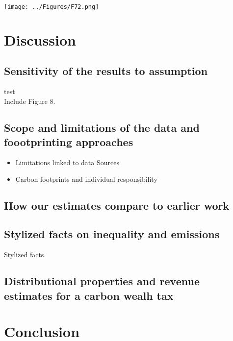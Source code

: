 \documentclass{beamer}
\begin{document}
\begin{frame}{\subsecname}
    \begin{center}
        \texttt{[image: ../Figures/F72.png]}
    \end{center}
\end{frame}

\section{Discussion}
\begin{frame}{\secname}
    \tableofcontents[currentsection, hideothersubsections, sections=\value{section}]
\end{frame}

\subsection{Sensitivity of the results to assumption}
\begin{frame}{\subsecname}
    test \\
    Include Figure 8.
\end{frame}

\subsection{Scope and limitations of the data and foootprinting approaches}
\begin{frame}{\subsecname}
    \begin{itemize}
        \item Limitations linked to data Sources
        \item Carbon footprints and individual responsibility
    \end{itemize}
\end{frame}

\subsection{How our estimates compare to earlier work}
\begin{frame}{\subsecname}
\end{frame}

\subsection{Stylized facts on inequality and emissions}
\begin{frame}{\subsecname}
    Stylized facts.
\end{frame}

\subsection{Distributional properties and revenue estimates for a carbon wealh tax}
\begin{frame}{\subsecname}
\end{frame}

\section{Conclusion}
\begin{frame}
    \tableofcontents[currentsection, hideothersubsections, sections=\value{section}]
\end{frame}
\end{document}
